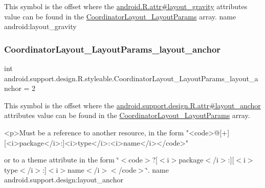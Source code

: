This symbol is the offset where the \hyperlink{}{android.\+R.\+attr\#layout\+\_\+gravity} attribute\textquotesingle{}s value can be found in the \hyperlink{classandroid_1_1support_1_1design_1_1R_1_1styleable_a8dd236b417b377b73830c1c47c3b2490}{Coordinator\+Layout\+\_\+\+Layout\+Params} array.  name android\+:layout\+\_\+gravity \mbox{\label{classandroid_1_1support_1_1design_1_1R_1_1styleable_a2b541addd48569ad627329eb45eb5445}} 
\subsubsection{\texorpdfstring{Coordinator\+Layout\+\_\+\+Layout\+Params\+\_\+layout\+\_\+anchor}{CoordinatorLayout\_LayoutParams\_layout\_anchor}}
{\footnotesize\ttfamily int android.\+support.\+design.\+R.\+styleable.\+Coordinator\+Layout\+\_\+\+Layout\+Params\+\_\+layout\+\_\+anchor = 2\hspace{0.3cm}{\ttfamily [static]}}

This symbol is the offset where the \hyperlink{classandroid_1_1support_1_1design_1_1R_1_1attr_a5491885998551f44c471758e2f47a6ea}{android.\+support.\+design.\+R.\+attr\#layout\+\_\+anchor} attribute\textquotesingle{}s value can be found in the \hyperlink{classandroid_1_1support_1_1design_1_1R_1_1styleable_a8dd236b417b377b73830c1c47c3b2490}{Coordinator\+Layout\+\_\+\+Layout\+Params} array.

\begin{DoxyVerb}      <p>Must be a reference to another resource, in the form "<code>@[+][<i>package</i>:]<i>type</i>:<i>name</i></code>"
\end{DoxyVerb}
 or to a theme attribute in the form \char`\"{}$<$code$>$?\mbox{[}$<$i$>$package$<$/i$>$\+:\mbox{]}\mbox{[}$<$i$>$type$<$/i$>$\+:\mbox{]}$<$i$>$name$<$/i$>$$<$/code$>$\char`\"{}.  name android.\+support.\+design\+:layout\+\_\+anchor \mbox{\label{classandroid_1_1support_1_1design_1_1R_1_1styleable_a62798f0cfacf5c8b36479c1585a47c87}} 
